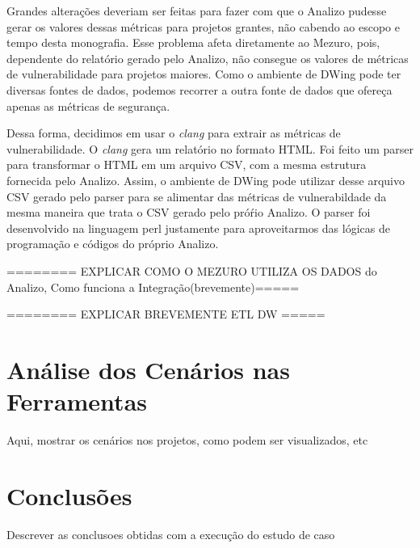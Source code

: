 Grandes alterações deveriam ser feitas para fazer com que o Analizo pudesse gerar os valores dessas métricas para projetos grantes, não cabendo ao escopo e tempo desta monografia. Esse problema afeta diretamente ao Mezuro, pois, dependente do relatório gerado pelo Analizo, não consegue os valores de métricas de vulnerabilidade para projetos maiores. Como o ambiente de DWing pode ter diversas fontes de dados, podemos recorrer a outra fonte de dados que ofereça apenas as métricas de segurança.

Dessa forma, decidimos em usar o \emph{clang} para extrair as métricas de vulnerabilidade. O \emph{clang} gera um relatório no formato HTML. Foi feito um parser para transformar o HTML em um arquivo CSV, com a mesma estrutura fornecida pelo Analizo. Assim, o ambiente de DWing pode utilizar desse arquivo CSV gerado pelo parser para se alimentar das métricas de vulnerabildade da mesma maneira que trata o CSV gerado pelo próŕio Analizo. O parser foi desenvolvido na linguagem perl justamente para aproveitarmos das lógicas de programação e códigos do próprio Analizo.

======== EXPLICAR COMO O MEZURO UTILIZA OS DADOS do Analizo, Como funciona a Integração(brevemente)=====


======== EXPLICAR BREVEMENTE ETL DW =====



\section{Análise dos Cenários nas Ferramentas}

Aqui, mostrar os cenários nos projetos, como podem ser visualizados, etc


\section{Conclusões}

Descrever as conclusoes obtidas com a execução do estudo de caso
